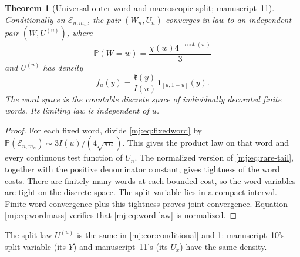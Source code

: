 \documentclass[11pt,a4paper]{article}
\newtheorem{theorem}{Theorem}[section]
\theoremstyle{definition}\newaliascnt{definition}{theorem}
\theoremstyle{remark}\newaliascnt{remark}{theorem}
\newcommand{\one}{\mathbf 1}
\newcommand{\ljP}{\mathbb P}
\newcommand{\ljcost}{\operatorname{cost}}
\begin{document}
\begin{theorem}[Universal outer word and macroscopic split; manuscript~11]
\label{mj:thm:conditional}
Conditionally on $\mathcal E_{n,m_n}$, the pair $(W_n,U_n)$ converges in law
to an independent pair $(W,U^{(u)})$, where
\begin{equation}
 \ljP(W=w)=\frac{\chi(w)4^{-\ljcost(w)}}3
 \label{mj:eq:word-law}
\end{equation}
and $U^{(u)}$ has density
\begin{equation}
 f_u(y)=\frac{\mathfrak k(y)}{I(u)}\one_{[u,1-u]}(y).
 \label{mj:eq:split-law}
\end{equation}
The word space is the countable discrete space of individually decorated
finite words. Its limiting law is independent of $u$.
\end{theorem}
\begin{proof}
For each fixed word, divide \eqref{mj:eq:fixedword} by
$\ljP(\mathcal E_{n,m_n})\sim3I(u)/(4\sqrt{\pi n})$. This gives the product
law on that word and every continuous test function of $U_n$. The normalized
version of \eqref{mj:eq:rare-tail}, together with the positive denominator
constant, gives tightness of the word costs. There are finitely many words at
each bounded cost, so the word variables are tight on the discrete space. The
split variable lies in a compact interval. Finite-word convergence plus this
tightness proves joint convergence. Equation \eqref{mj:eq:wordmass} verifies
that \eqref{mj:eq:word-law} is normalized.
\end{proof}

The split law $U^{(u)}$ is the same in \cref{mj:cor:conditional} and
\cref{mj:thm:conditional}: manuscript~10's split variable (its $Y$) and
manuscript~11's (its $U_x$) have the same density.
\end{document}
